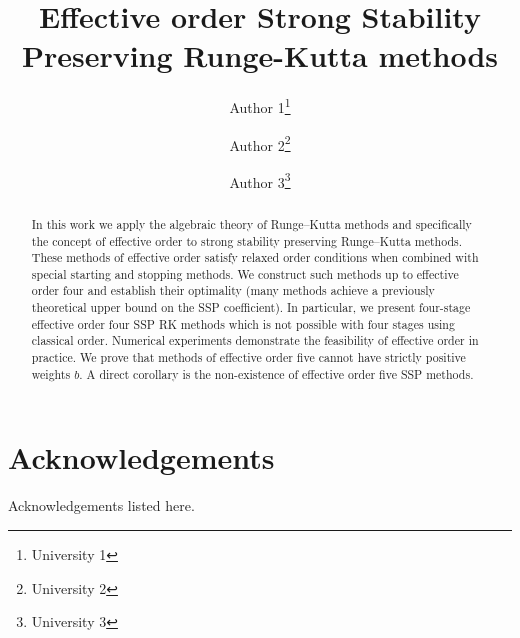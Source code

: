 \documentclass[10pt,a4paper,oneside]{article}
\title{Effective order Strong Stability Preserving Runge-Kutta methods}
\author{Author 1\footnote{University 1}
        \and
        Author 2\footnote{University 2}
        \and
        Author 3\footnote{University 3}}
\numberwithin{equation}{section}
\numberwithin{theorem}{section}
\numberwithin{table}{section}
\begin{document}
\maketitle


\begin{abstract}
  In this work we apply the algebraic theory of Runge--Kutta methods
  and specifically the concept of effective order to strong stability
  preserving Runge--Kutta methods.  These methods of effective order
  satisfy relaxed order conditions when combined with special starting
  and stopping methods.  We construct such methods up to effective
  order four and establish their optimality (many methods achieve a
  previously theoretical upper bound on the SSP coefficient).  In
  particular, we present four-stage effective order four SSP RK
  methods which is not possible with four stages using classical
  order.  Numerical experiments demonstrate the feasibility of
  effective order in practice.  We prove that methods of effective
  order five cannot have strictly positive weights $b$.  A direct
  corollary is the non-existence of effective order five SSP methods.
\end{abstract}




%






\section*{Acknowledgements}
	Acknowledgements listed here.

\appendix



\end{document}
